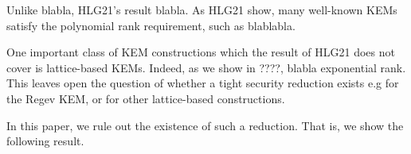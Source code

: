 Unlike blabla, HLG21's result blabla.
As HLG21 show, many well-known KEMs satisfy the polynomial rank requirement, such as blablabla.

One important class of KEM constructions which the result of HLG21 does not cover is lattice-based KEMs.
Indeed, as we show in ????, blabla exponential rank.
This leaves open the question of whether a tight security reduction exists e.g for the Regev KEM,
or for other lattice-based constructions.

In this paper, we rule out the existence of such a reduction.
That is, we show the following result.







